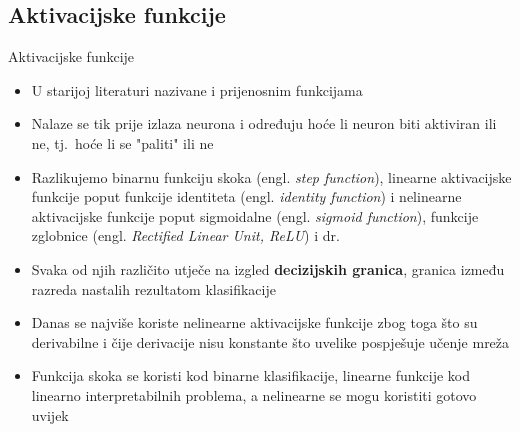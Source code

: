 \documentclass{beamer}
\begin{document}
    \subsection{Aktivacijske funkcije}
        \begin{frame}{Aktivacijske funkcije}
            \begin{itemize}
                \item U starijoj literaturi nazivane i prijenosnim funkcijama
                \item Nalaze se tik prije izlaza neurona i određuju hoće li neuron biti aktiviran ili ne, tj.\ hoće li se "paliti" ili ne
                \item Razlikujemo binarnu funkciju skoka (engl. \textit{step function}), linearne aktivacijske funkcije poput funkcije identiteta (engl. \textit{identity function}) i nelinearne aktivacijske funkcije poput sigmoidalne (engl. \textit{sigmoid function}), funkcije zglobnice (engl. \textit{Rectified Linear Unit, ReLU}) i dr.
                \item Svaka od njih različito utječe na izgled \textbf{decizijskih granica}, granica između razreda nastalih rezultatom klasifikacije
                \item Danas se najviše koriste nelinearne aktivacijske funkcije zbog toga što su derivabilne i čije derivacije nisu konstante što uvelike pospješuje učenje mreža
                \item Funkcija skoka se koristi kod binarne klasifikacije, linearne funkcije kod linearno interpretabilnih problema, a nelinearne se mogu koristiti gotovo uvijek
            \end{itemize}
        \end{frame}
\end{document}
